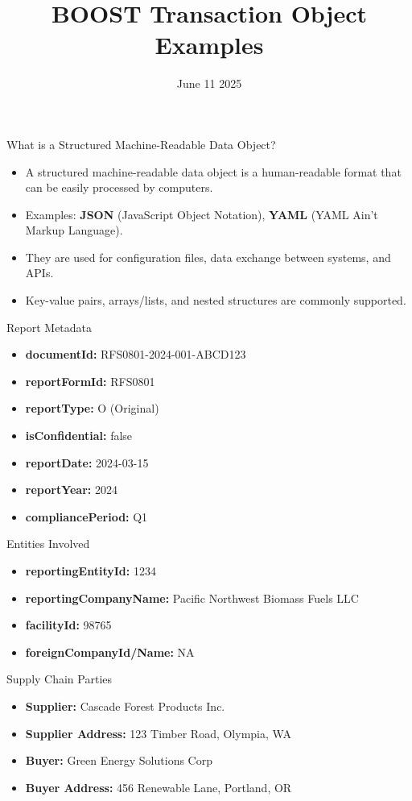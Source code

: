\documentclass{beamer}
\title{BOOST Transaction Object Examples}
\date{June 11 2025}
\begin{document}
\begin{frame}{What is a Structured Machine-Readable Data Object?}
\begin{itemize}
  \item A structured machine-readable data object is a human-readable format that can be easily processed by computers.
  \item Examples: \textbf{JSON} (JavaScript Object Notation), \textbf{YAML} (YAML Ain't Markup Language).
  \item They are used for configuration files, data exchange between systems, and APIs.
  \item Key-value pairs, arrays/lists, and nested structures are commonly supported. 
\end{itemize}
\end{frame}

\begin{frame}{Report Metadata}
\begin{itemize}
  \item \textbf{documentId:} RFS0801-2024-001-ABCD123
  \item \textbf{reportFormId:} RFS0801
  \item \textbf{reportType:} O (Original)
  \item \textbf{isConfidential:} false
  \item \textbf{reportDate:} 2024-03-15
  \item \textbf{reportYear:} 2024
  \item \textbf{compliancePeriod:} Q1
\end{itemize}
\end{frame}

\begin{frame}{Entities Involved}
\begin{itemize}
  \item \textbf{reportingEntityId:} 1234
  \item \textbf{reportingCompanyName:} Pacific Northwest Biomass Fuels LLC
  \item \textbf{facilityId:} 98765
  \item \textbf{foreignCompanyId/Name:} NA
\end{itemize}
\end{frame}

\begin{frame}{Supply Chain Parties}
\begin{itemize}
  \item \textbf{Supplier:} Cascade Forest Products Inc.
  \item \textbf{Supplier Address:} 123 Timber Road, Olympia, WA
  \item \textbf{Buyer:} Green Energy Solutions Corp
  \item \textbf{Buyer Address:} 456 Renewable Lane, Portland, OR
\end{itemize}
\end{frame}
\end{document}
